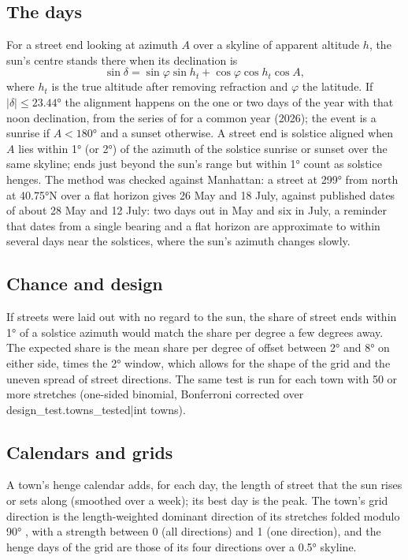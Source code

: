 \documentclass[11pt,a4paper]{article}
\begin{document}
\subsection{The days}
For a street end looking at azimuth $A$ over a skyline of apparent altitude $h$, the sun's centre stands there when its declination is
\[\sin\delta = \sin\varphi\sin h_t + \cos\varphi\cos h_t\cos A,\]
where $h_t$ is the true altitude after removing refraction \citep{bennett} and $\varphi$ the latitude. If $|\delta| \le 23.44°$ the alignment happens on the one or two days of the year with that noon declination, from the series of \citet{spencer} for a common year (2026); the event is a sunrise if $A < 180°$ and a sunset otherwise. A street end is solstice aligned when $A$ lies within 1° (or 2°) of the azimuth of the solstice sunrise or sunset over the same skyline; ends just beyond the sun's range but within 1° count as solstice henges. The method was checked against Manhattan: a street at 299° from north at 40.75°N over a flat horizon gives 26 May and 18 July, against published dates of about 28 May and 12 July: two days out in May and six in July, a reminder that dates from a single bearing and a flat horizon are approximate to within several days near the solstices, where the sun's azimuth changes slowly.

\subsection{Chance and design}
If streets were laid out with no regard to the sun, the share of street ends within 1° of a solstice azimuth would match the share per degree a few degrees away. The expected share is the mean share per degree of offset between 2° and 8° on either side, times the 2° window, which allows for the shape of the grid and the uneven spread of street directions. The same test is run for each town with 50 or more stretches (one-sided binomial, Bonferroni corrected over {{design_test.towns_tested|int}} towns).

\subsection{Calendars and grids}
A town's henge calendar adds, for each day, the length of street that the sun rises or sets along (smoothed over a week); its best day is the peak. The town's grid direction is the length-weighted dominant direction of its stretches folded modulo 90° \citep[compare][]{boeing}, with a strength between 0 (all directions) and 1 (one direction), and the henge days of the grid are those of its four directions over a 0.5° skyline.
\end{document}
